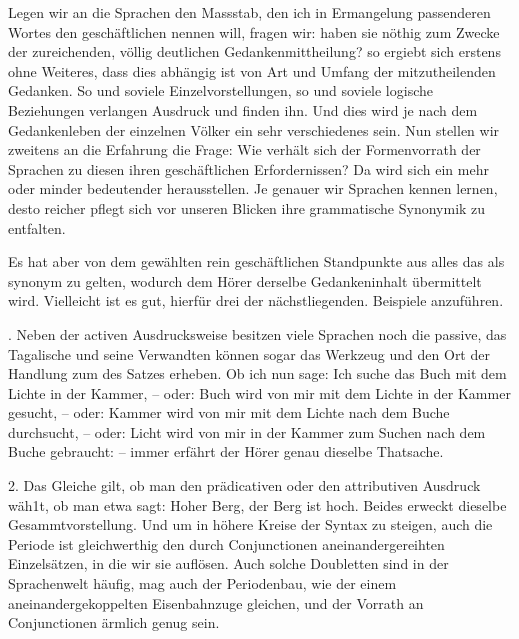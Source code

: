 Legen wir an die Sprachen den Massstab, den ich in Ermangelung  passenderen Wortes den geschäftlichen nennen will, fragen wir:  haben \label{sp.363} sie nöthig zum Zwecke der zureichenden, völlig deutlichen Gedankenmittheilung? so ergiebt sich erstens ohne Weiteres, dass dies abhängig ist von Art und Umfang der mitzutheilenden Gedanken. So und soviele Einzelvorstellungen, so und soviele logische Beziehungen verlangen Ausdruck und finden ihn. Und dies  wird je nach dem Gedankenleben der einzelnen Völker ein sehr verschiedenes sein. Nun stellen wir zweitens an die Erfahrung die Frage: Wie verhält sich der Formenvorrath der Sprachen zu diesen ihren geschäftlichen Erfordernissen? Da wird sich ein mehr oder minder bedeutender  herausstellen. Je genauer wir Sprachen kennen lernen, desto reicher pflegt sich vor unseren Blicken ihre grammatische Synonymik zu entfalten.

Es hat aber von dem gewählten rein geschäftlichen Standpunkte aus alles das als synonym zu gelten, wodurch dem Hörer derselbe Gedankeninhalt übermittelt wird. Vielleicht ist es gut, hierfür drei der nächstliegenden. Beispiele anzuführen.

. Neben der activen Ausdrucksweise besitzen viele Sprachen noch die passive, das Tagalische und seine Verwandten können sogar das Werkzeug und den Ort der Handlung zum  des Satzes erheben. Ob ich nun sage: Ich suche das Buch mit dem Lichte in der Kammer, – oder:  Buch wird von mir mit dem Lichte in der Kammer gesucht, – oder:  Kammer wird von mir mit dem Lichte nach dem Buche durchsucht, – oder:  Licht wird von mir in der Kammer zum Suchen nach dem Buche gebraucht: – immer erfährt der Hörer genau dieselbe Thatsache.

2. Das Gleiche gilt, ob man den prädicativen oder den attributiven Ausdruck wäh1t, ob man etwa sagt: Hoher Berg,  der Berg ist hoch. Beides erweckt dieselbe Gesammtvorstellung. Und um in höhere Kreise der Syntax zu steigen, \label{fp.215} auch die Periode ist gleichwerthig den durch Conjunctionen aneinandergereihten Einzelsätzen, in die wir sie auflösen. Auch solche Doubletten sind in der Sprachenwelt häufig, mag auch der Periodenbau, wie der  einem aneinandergekoppelten Eisenbahnzuge gleichen, und der Vorrath an Conjunctionen ärmlich genug sein.


